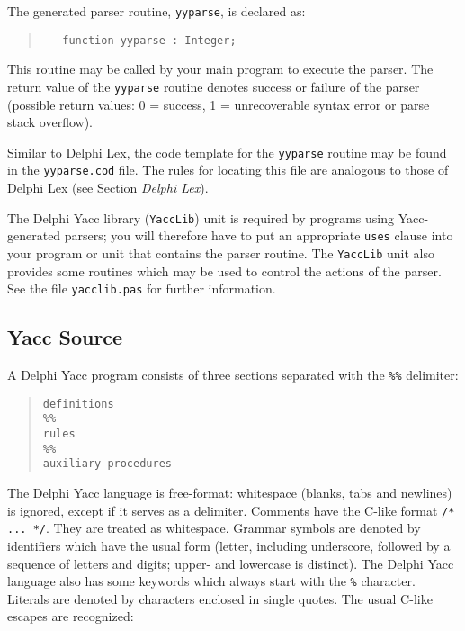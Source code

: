 \documentclass[a4paper]{article}
\begin{document}
The generated parser routine, \verb"yyparse", is declared as:

\begin{quote}\begin{verbatim}
   function yyparse : Integer;
\end{verbatim}\end{quote}

This routine may be called by your main program to execute the parser.
The return value of the \verb"yyparse" routine denotes success or failure of
the parser (possible return values: 0 = success, 1 = unrecoverable syntax
error or parse stack overflow).

Similar to Delphi Lex, the code template for the \verb"yyparse" routine may be
found in the \verb"yyparse.cod" file. The rules for locating this file are
analogous to those of Delphi Lex (see Section {\em Delphi Lex\/}).

The Delphi Yacc library (\verb"YaccLib") unit is required by programs using Yacc-
generated parsers; you will therefore have to put an appropriate \verb"uses"
clause into your program or unit that contains the parser routine. The
\verb"YaccLib" unit also provides some routines which may be used to control
the actions of the parser. See the file \verb"yacclib.pas" for further
information.

\subsection{Yacc Source}

A Delphi Yacc program consists of three sections separated with the \verb"%%"
delimiter:

\begin{quote}\begin{verbatim}
definitions
%%
rules
%%
auxiliary procedures
\end{verbatim}\end{quote}

The Delphi Yacc language is free-format: whitespace (blanks, tabs and newlines)
is ignored, except if it serves as a delimiter. Comments have the C-like
format \verb"/* ... */". They are treated as whitespace. Grammar symbols are
denoted by identifiers which have the usual form (letter, including
underscore, followed by a sequence of letters and digits; upper- and
lowercase is distinct). The Delphi Yacc language also has some keywords which
always start with the \verb"%" character. Literals are denoted by characters
enclosed in single quotes. The usual C-like escapes are recognized:
\end{document}
